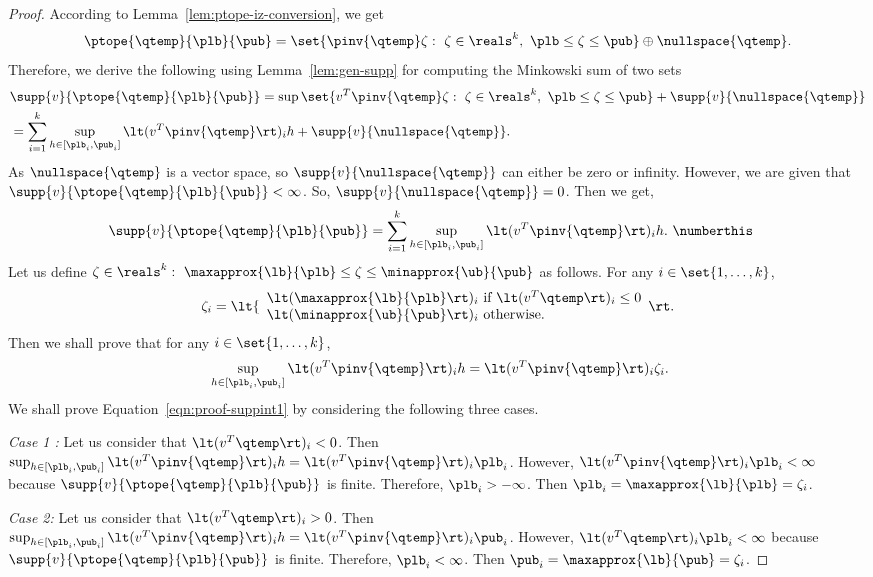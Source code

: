 %
\begin{proof}
According to Lemma~\ref{lem:ptope-iz-conversion}, we get
%
\[
\ptope{\qtemp}{\plb}{\pub}=\set{\pinv{\qtemp}\zeta:~\zeta\in\reals^k,~\plb\leq\zeta\leq\pub}\oplus\nullspace{\qtemp}.
\]
%
Therefore,
we derive the following using Lemma~\ref{lem:gen-supp} for computing
the Minkowski sum of two sets
%
\begin{align*}
&
  \supp{v}{\ptope{\qtemp}{\plb}{\pub}}=\sup\set{v^T\pinv{\qtemp}\zeta:~\zeta\in\reals^k,~\plb\leq\zeta\leq\pub}+\supp{v}{\nullspace{\qtemp}}\\
& =  \sum_{i=1}^k\sup_{h\in[\plb_i,\pub_i]}\lt(v^T\pinv{\qtemp}\rt)_ih+\supp{v}{\nullspace{\qtemp}}.
\end{align*}
%
As $\nullspace{\qtemp}$ is a vector space, so
$\supp{v}{\nullspace{\qtemp}}$ can either be zero or infinity.
However, we are given that
$\supp{v}{\ptope{\qtemp}{\plb}{\pub}}<\infty$.  So,
$\supp{v}{\nullspace{\qtemp}}=0$.  Then we get,
%
\begin{align*}
&
  \supp{v}{\ptope{\qtemp}{\plb}{\pub}}=\sum_{i=1}^k\sup_{h\in[\plb_i,\pub_i]}\lt(v^T\pinv{\qtemp}\rt)_ih.~\numberthis\label{eqn:proof-suppint2}
\end{align*}
%
Let us define
$\zeta\in\reals^k:~\maxapprox{\lb}{\plb}\leq\zeta\leq\minapprox{\ub}{\pub}$
as follows.  For any $i\in\set{1,\ldots,k}$,
%
\[
\zeta_i=\lt\{\begin{array}{l}
\lt(\maxapprox{\lb}{\plb}\rt)_i~\text{if}~\lt(v^T\qtemp\rt)_i\leq 0\\
\lt(\minapprox{\ub}{\pub}\rt)_i~\text{otherwise}.
\end{array}
\rt.
\]
%
Then we shall prove that for any $i\in\set{1,\ldots,k}$,
%
\begin{equation}~\label{eqn:proof-suppint1}
\sup_{h\in[\plb_i,\pub_i]}\lt(v^T\pinv{\qtemp}\rt)_ih = \lt(v^T\pinv{\qtemp}\rt)_i\zeta_i.
\end{equation}
%
We shall prove Equation~\ref{eqn:proof-suppint1} by considering the following three cases.

{\it Case 1  :}  Let us consider that $\lt(v^T\qtemp\rt)_i<0$.  Then
$\sup_{h\in[\plb_i,\pub_i]}\lt(v^T\pinv{\qtemp}\rt)_ih=\lt(v^T\pinv{\qtemp}\rt)_i\plb_i$.
However, $\lt(v^T\pinv{\qtemp}\rt)_i\plb_i<\infty$ because
$\supp{v}{\ptope{\qtemp}{\plb}{\pub}}$ is finite.  Therefore,
$\plb_i>-\infty$.  Then $\plb_i=\maxapprox{\lb}{\plb}=\zeta_i$.  

{\it Case 2:  } Let us consider that $\lt(v^T\qtemp\rt)_i>0$.  Then
$\sup_{h\in[\plb_i,\pub_i]}\lt(v^T\pinv{\qtemp}\rt)_ih=\lt(v^T\pinv{\qtemp}\rt)_i\pub_i$.
However, $\lt(v^T\qtemp\rt)_i\plb_i<\infty$ because
$\supp{v}{\ptope{\qtemp}{\plb}{\pub}}$ is finite.  Therefore,
$\plb_i<\infty$.  Then $\pub_i=\maxapprox{\lb}{\pub}=\zeta_i$.  


\end{proof}

